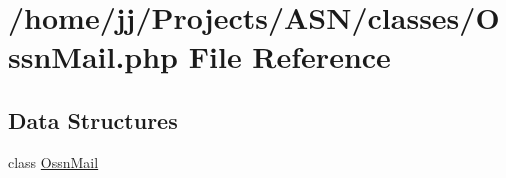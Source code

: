 \hypertarget{_ossn_mail_8php}{}\section{/home/jj/\+Projects/\+A\+S\+N/classes/\+Ossn\+Mail.php File Reference}
\label{_ossn_mail_8php}
\subsection*{Data Structures}
\begin{DoxyCompactItemize}
\item 
class \hyperlink{class_ossn_mail}{Ossn\+Mail}
\end{DoxyCompactItemize}
